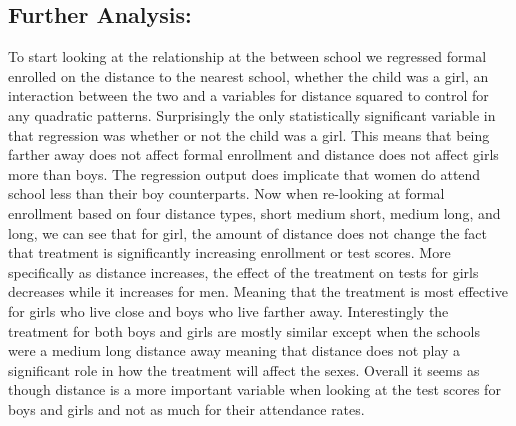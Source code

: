 \documentclass[
]{article}
\begin{document}
\hypertarget{further-analysis}{%
\subsection{Further Analysis:}\label{further-analysis}}

To start looking at the relationship at the between school we regressed
formal enrolled on the distance to the nearest school, whether the child
was a girl, an interaction between the two and a variables for distance
squared to control for any quadratic patterns. Surprisingly the only
statistically significant variable in that regression was whether or not
the child was a girl. This means that being farther away does not affect
formal enrollment and distance does not affect girls more than boys. The
regression output does implicate that women do attend school less than
their boy counterparts. Now when re-looking at formal enrollment based
on four distance types, short medium short, medium long, and long, we
can see that for girl, the amount of distance does not change the fact
that treatment is significantly increasing enrollment or test scores.
More specifically as distance increases, the effect of the treatment on
tests for girls decreases while it increases for men. Meaning that the
treatment is most effective for girls who live close and boys who live
farther away. Interestingly the treatment for both boys and girls are
mostly similar except when the schools were a medium long distance away
meaning that distance does not play a significant role in how the
treatment will affect the sexes. Overall it seems as though distance is
a more important variable when looking at the test scores for boys and
girls and not as much for their attendance rates.
\end{document}
